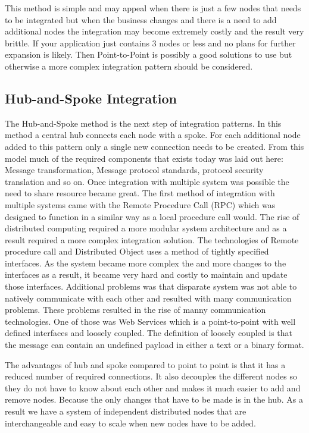 \documentclass{llncs}
\begin{document}
This method is simple and may appeal when there is just a few nodes that needs to be integrated but when the business changes and there is a need to add additional nodes the integration may become extremely costly and the result very brittle. If your application just contains 3 nodes or less and no plans for further expansion is likely. Then Point-to-Point is possibly a good solutions to use but otherwise a more complex integration pattern should be considered.


\subsection{Hub-and-Spoke Integration}
The Hub-and-Spoke method is the next step of integration patterns. In this method a central hub connects each node with a spoke. For each additional node added to this pattern only a single new connection needs to be created. From this model much of the required components that exists today was laid out here: Message transformation, Message protocol standards, protocol security translation and so on. Once integration with multiple system was possible the need to share resource became great. The first method of integration with multiple systems came with the Remote Procedure Call (RPC) which was designed to function in a similar way as a local procedure call would. The rise of distributed computing required a more modular system architecture and as a result required a more complex integration solution. The technologies of Remote procedure call and Distributed Object uses a method of tightly specified interfaces. As the system became more complex the and more changes to the interfaces as a result, it became very hard and costly to maintain and update those interfaces. Additional problems was that disparate system was not able to natively communicate with each other and resulted with many communication problems. These problems resulted in the rise of manny communication technologies. One of those was Web Services which is a point-to-point with well defined interfaces and loosely coupled. The definition of loosely coupled is that the message can contain an undefined payload in either a text or a binary format.

The advantages of hub and spoke compared to point to point is that it has a reduced number of required connections. It also decouples the different nodes so they do not have to know about each other and makes it much easier to add and remove nodes. Because the only changes that have to be made is in the hub. As a result we have a system of independent distributed nodes that are interchangeable and easy to scale when new nodes have to be added.
\end{document}
